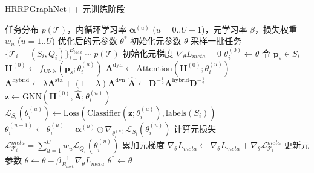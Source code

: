 \begin{algorithm}[htbp] %
\caption{HRRPGraphNet++ 元训练阶段}
\label{alg:meta_training}
\begin{algorithmic}[1] %
    \REQUIRE 任务分布 $p(\mathcal{T})$，内循环学习率 $\boldsymbol{\alpha}^{(u)}$ ($u=0..U-1$)，元学习率 $\beta$，损失权重 $w_u$ ($u=1..U$)
    \ENSURE 优化后的元参数 $\theta^*$
    \STATE 初始化元参数 $\theta$
        \STATE 采样一批任务 $\{\mathcal{T}_i = (S_i, Q_i)\}_{i=1}^{B_{task}} \sim p(\mathcal{T})$ %
        \STATE 初始化元梯度 $\nabla_\theta L_{meta} = 0$
            \STATE $\theta_i^{(0)} \leftarrow \theta$
                \STATE 令 $\mathbf{p}_s \in S_i$
                \STATE $\mathbf{H}^{(0)} \leftarrow f_{\text{CNN}}(\mathbf{p}_s; \theta_i^{(u)})$ %
                \STATE $\mathbf{A}^{\text{dyn}} \leftarrow \text{Attention}(\mathbf{H}^{(0)}; \theta_i^{(u)})$ %
                \STATE $\mathbf{A}^{\text{hybrid}} \leftarrow \lambda \mathbf{A}^{\text{sta}} + (1-\lambda) \mathbf{A}^{\text{dyn}}$
                \STATE $\hat{\mathbf{A}} \leftarrow \mathbf{D}^{-\frac{1}{2}} \mathbf{A}^{\text{hybrid}} \mathbf{D}^{-\frac{1}{2}}$
                \STATE $\mathbf{z} \leftarrow \text{GNN}(\mathbf{H}^{(0)}, \hat{\mathbf{A}}; \theta_i^{(u)})$ %
                \STATE $\mathcal{L}_{S_i}(\theta_i^{(u)}) \leftarrow \text{Loss}( \text{Classifier}(\mathbf{z}; \theta_i^{(u)}), \text{labels}(S_i) )$
                \STATE $\theta_i^{(u+1)} \leftarrow \theta_i^{(u)} - \boldsymbol{\alpha}^{(u)} \odot \nabla_{\theta_i^{(u)}} \mathcal{L}_{S_i}(\theta_i^{(u)})$ %
            \ENDFOR %
            \STATE 计算元损失 $\mathcal{L}_{\mathcal{T}_i}^{meta} = \sum_{u=1}^{U} w_u \mathcal{L}_{Q_i}(\theta_i^{(u)})$ %
            \STATE 累加元梯度 $\nabla_\theta L_{meta} \leftarrow \nabla_\theta L_{meta} + \nabla_\theta \mathcal{L}_{\mathcal{T}_i}^{meta}$ %
        \ENDFOR %
        \STATE 更新元参数 $\theta \leftarrow \theta - \beta \frac{1}{B_{task}} \nabla_\theta L_{meta}$ %
    \ENDWHILE %
    \STATE $\theta^* \leftarrow \theta$
\end{algorithmic}
\end{algorithm}

